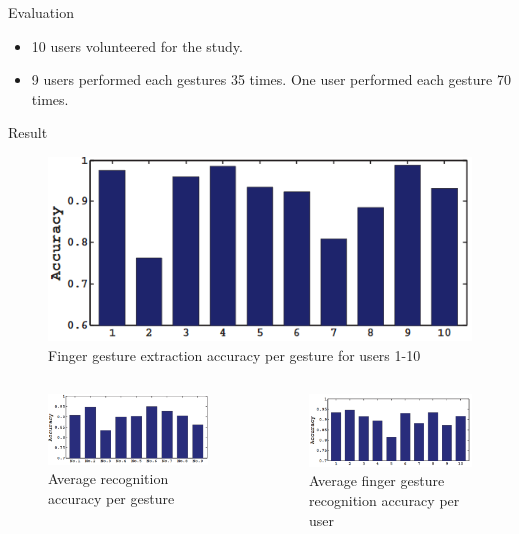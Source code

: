 \documentclass{beamer}
\begin{document}
\begin{frame}{Evaluation}
	\begin{itemize}
		\item 10 users volunteered for the study.
		\item 9 users performed each gestures 35 times. One user performed each gesture 70 times. 
	\end{itemize}
\end{frame}

\begin{frame}{Result}
	\begin{figure}
		\includegraphics[width=0.50\linewidth]{Images/gesture-detection-accuracy.png}
		\caption{Finger gesture extraction accuracy per gesture for users 1-10~\cite{li2016wifinger}}
	\end{figure}
	
		\begin{columns}
			\begin{figure}
				\includegraphics[width=0.75\linewidth]{Images/recognition-accuracy.png}
			\caption{Average recognition accuracy per gesture~\cite{li2016wifinger}}
			\end{figure}
			\begin{figure}
				\includegraphics[width=0.75\linewidth]{Images/recognition-accuracy-per-user.png}
			\caption{Average finger gesture recognition accuracy per user~\cite{li2016wifinger}}
			\end{figure}
	\end{columns}
\end{frame}
\end{document}
